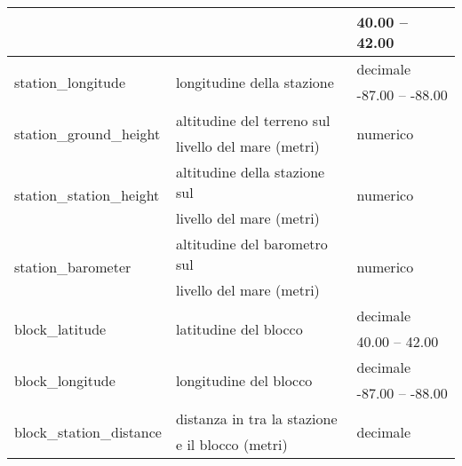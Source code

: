 \begin{longtable}{lll}
	& & {40.00} -- {42.00}  \\ \hline
	\multirow{2}{*}{station\_longitude}	& \multirow{2}{*}{longitudine della 
		stazione} 	&  decimale     \\ 
	& & {-87.00} -- {-88.00} \\ \hline 
	\multirow{2}{*}{station\_ground\_height}	& 	altitudine del terreno sul  
	& 	\multirow{2}{*}{numerico}	\\
	& livello del mare (metri) &\\ \hline		
	\multirow{2}{*}{station\_station\_height}	& 	altitudine della stazione 
	sul  &	\multirow{2}{*}{numerico} 	\\
	& livello del mare (metri) & \\ \hline
	\multirow{2}{*}{station\_barometer}			& 	altitudine del barometro 
	sul  & \multirow{2}{*}{numerico}		\\
	& livello del mare (metri) &\\ \hline	
	\multirow{2}{*}{block\_latitude}	& \multirow{2}{*}{latitudine del 
		blocco}	&  decimale    \\ 
	& & {40.00} -- {42.00}  \\ \hline
	\multirow{2}{*}{block\_longitude}	& \multirow{2}{*}{longitudine del 
		blocco} &  decimale     \\ 
	& & {-87.00} -- {-88.00} \\ \hline 
	\multirow{2}{*}{block\_station\_distance}	& distanza in tra la stazione  
	&  \multirow{2}{*}{decimale} \\ 
	& e il blocco (metri) &\\  
	\bottomrule
\end{longtable}
\label{tab:features}

